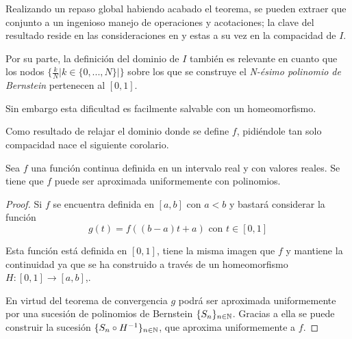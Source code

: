 %

Realizando un repaso global habiendo acabado el teorema, se pueden extraer que conjunto a un ingenioso manejo de operaciones y acotaciones; la clave del resultado reside  en las consideraciones
en   y estas a su vez en la 
compacidad de $I$.

Por su parte, la definición del dominio de $I$ también es relevante en 
cuanto que los nodos $\{ \frac{k}{N} | k\in \{0,..., N\} |  \}$ sobre los que se construye el \textit{N-ésimo polinomio de Bernstein} pertenecen al $[0,1]$.

Sin embargo esta dificultad es facilmente salvable con un homeomorfismo. 

Como resultado de relajar el dominio donde se define $f$, pidiéndole tan solo
compacidad nace el siguiente corolario.  

\begin{corolario} \label{teo:TeoremaAproximacionWeierstrass}
    Sea $f$ una función continua definida en un intervalo real y con valores reales. Se tiene que $f$ puede ser aproximada uniformemente con polinomios. 
\end{corolario}  

\begin{proof}
    Si $f$ se encuentra definida en $[a,b]$ con $a<b$ y bastará considerar la función
    \begin{equation*}
        g(t) = f( (b-a)t + a) \text{ con } t \in [0,1]
    \end{equation*}

    Esta función está definida en $[0,1]$, tiene la misma imagen que $f$ y 
    mantiene la continuidad ya que se ha construido a través de un homeomorfismo 
    $H:[0,1] \longrightarrow [a,b]$,. 

    En virtud del teorema de convergencia 
    $g$ podrá ser aproximada uniformemente por una sucesión de polinomios de Bernstein $\{S_n\}_{n \in \mathbb{N}}$. Gracias a ella se puede
    construir la sucesión $\{S_n \circ H^{-1}\}_{n \in \mathbb{N}}$, que aproxima uniformemente a $f$. 
\end{proof}